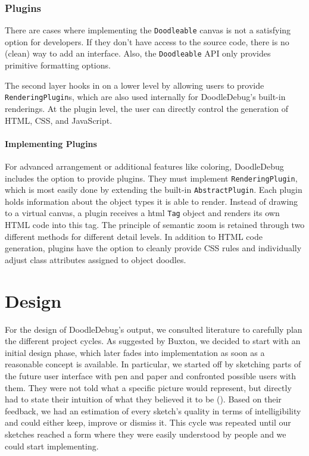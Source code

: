 \documentclass[english]{scrartcl}
\newcommand{\DD}{Dood\-le\-De\-bug\xspace}
\begin{document}
\subsubsection{Plugins}
There are cases where implementing the \texttt{Doodleable} canvas is not a satisfying option for developers.
If they don't have access to the source code, there is no (clean) way to add an interface.
Also, the \texttt{Doodleable} API only provides primitive formatting options.

The second layer hooks in on a lower level by allowing users to provide \texttt{RenderingPlugin}s, which are also used internally for \DD's built-in renderings.
At the plugin level, the user can directly control the generation of HTML, CSS, and JavaScript.

\paragraph{Implementing Plugins}
For advanced arrangement or additional features like coloring, \DD includes the option to provide plugins.
They must implement \texttt{RenderingPlugin}, which is most easily done by extending the built-in \texttt{AbstractPlugin}.
Each plugin holds information about the object types it is able to render.
Instead of drawing to a virtual canvas, a plugin receives a html \texttt{Tag} object and renders its own HTML code into this tag.
The principle of semantic zoom is retained through two different methods for different detail levels.
In addition to HTML code generation, plugins have the option to cleanly provide CSS rules and individually adjust class attributes assigned to object doodles.


\section{Design}
For the design of \DD's output, we consulted literature to carefully plan the different project cycles.
As suggested by Buxton\cite[p. 73-76]{Buxt07a}, we decided to start with an initial design phase, which later fades into implementation as soon as a reasonable concept is available.
In particular, we started off by sketching parts of the future user interface with pen and paper and confronted possible users with them.
They were not told what a specific picture would represent, but directly had to state their intuition of what they believed it to be ().
Based on their feedback, we had an estimation of every sketch's quality in terms of intelligibility and could either keep, improve or dismiss it.
This cycle was repeated until our sketches reached a form where they were easily understood by people and we could start implementing.
\end{document}
